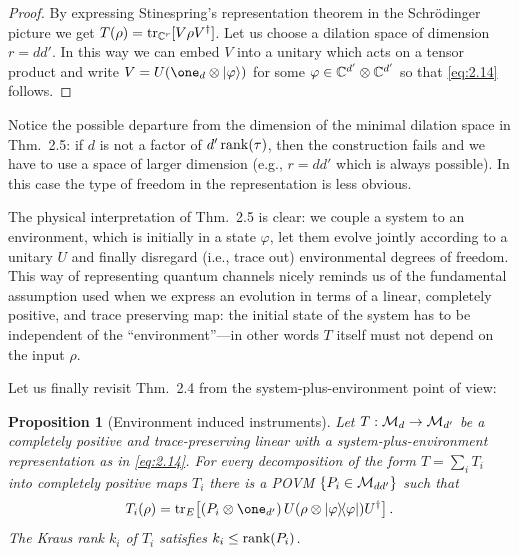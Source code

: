 \documentclass[11pt,a4paper]{article}
\numberwithin{equation}{section}
\theoremstyle{plain}
\newtheorem{proposition}{Proposition}[section]
\theoremstyle{definition}
\begin{document}
\begin{proof}
    By expressing Stinespring's representation theorem in the Schr\"odinger picture we
    get $T(\rho)=\operatorname{tr}_{\mathbb{C}^r}[V\rho V^\dagger]$. Let us choose a dilation space of
    dimension $r=dd'$. In this way we can embed $V$ into a unitary which acts on a
    tensor product and write $V = U(\one_d \otimes \ket{\varphi})$ for some
    $\varphi \in \mathbb{C}^{d'}\otimes \mathbb{C}^{d'}$ so that \eqref{eq:2.14} follows.
\end{proof}

Notice the possible departure from the dimension of the minimal dilation space in
Thm.~2.5: if $d$ is not a factor of $d'\operatorname{rank}(\tau)$, then the construction fails and
we have to use a space of larger dimension (e.g., $r=dd'$ which is always possible).
In this case the type of freedom in the representation is less obvious.

The physical interpretation of Thm.~2.5 is clear: we couple a system to an
environment, which is initially in a state $\varphi$, let them evolve jointly
according to a unitary $U$ and finally disregard (i.e., trace out) environmental
degrees of freedom. This way of representing quantum channels nicely reminds us of
the fundamental assumption used when we express an evolution in terms of a linear,
completely positive, and trace preserving map: the initial state of the system has
to be independent of the ``environment''---in other words $T$ itself must not depend
on the input $\rho$.

Let us finally revisit Thm.~2.4 from the system-plus-environment point of view:

\begin{proposition}[Environment induced instruments]
    Let $T:\mathcal{M}_d \to \mathcal{M}_{d'}$ be a completely positive and trace-preserving linear
    with a system-plus-environment representation as in \eqref{eq:2.14}. For every
    decomposition of the form $T=\sum_i T_i$ into completely positive maps $T_i$ there
    is a POVM $\{P_i \in \mathcal{M}_{dd'}\}$ such that
    \begin{equation}\label{eq:2.15}
        T_i(\rho) = \tr_E\!\left[(P_i \otimes \one_{d'})\,U(\rho \otimes \ketbra{\varphi}{\varphi})U^\dagger\right].
    \end{equation}
    The Kraus rank $k_i$ of $T_i$ satisfies $k_i \le \operatorname{rank}(P_i)$.
\end{proposition}
\end{document}
